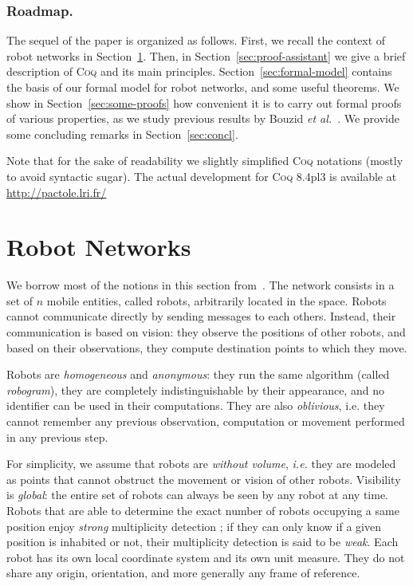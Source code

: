 \documentclass[11pt,a4]{llncs}
\newcommand{\x}{\xspace}
\newcommand{\coq}{\textsc{Coq}\x}
\begin{document}
\subsubsection*{Roadmap.} 
The sequel of the paper is organized as follows.
First, we recall the context of robot networks in Section~\ref{sec:robots}. Then, in Section~\ref{sec:proof-assistant} we give a brief
description of \coq and its main principles. Section~\ref{sec:formal-model} contains the basis of our formal model
for robot networks, and some useful theorems. We show in Section~\ref{sec:some-proofs} how convenient it is to carry
out formal proofs of various properties, as we study previous results by
Bouzid \emph{et al.}~\cite{bouzid10tcs}. We provide some concluding remarks in Section~\ref{sec:concl}. 

Note that for the sake of readability we slightly simplified \coq
notations (mostly to avoid syntactic sugar). The actual development
for \coq 8.4pl3 is
available at \url{http://pactole.lri.fr/}

\section{Robot Networks}\label{sec:robots}

We borrow most of the notions in this section
from~\cite{suzuki99siam,agmon2006fault,FPS12b}.
The network consists in a set of $n$ mobile entities, called robots, arbitrarily located 
in the space.
Robots cannot communicate directly by sending messages to each others.
Instead, their communication is based on vision:
they observe the positions of other robots, and based on their observations, 
they compute destination points to which they move.

Robots are \emph{homogeneous} and \emph{anonymous}: 
they run the same algorithm (called \emph{robogram}),
they are completely 
indistinguishable by their appearance, and no 
identifier can be used in their computations.
They are also \emph{oblivious}, {i.e.} they cannot remember any previous observation, computation or movement
performed in any previous step.

For simplicity, we assume that robots are \emph{without volume}, \emph{i.e.} 
they are modeled as points that cannot obstruct the movement or vision of other robots.
Visibility
is \emph{global}: the entire set of robots can always be seen by
any robot at any time.
Robots that are able to determine the exact number of robots occupying a same
position enjoy \emph{strong} multiplicity detection ; if they can
only know if a given position is inhabited or not, their multiplicity
detection is said to be \emph{weak}. 
Each robot has its own local coordinate system and its own unit measure. They do not share
any origin, orientation, and more generally any frame of reference.
\end{document}

